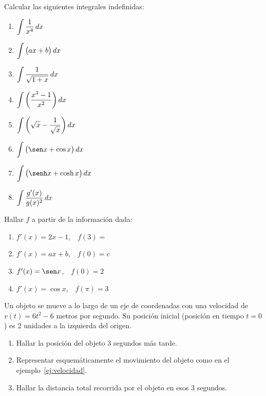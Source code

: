 \item Calcular las siguientes integrales indefinidas:
\begin{multicols}{2}
  \begin{enumerate}
    \item $\displaystyle \int \frac{1}{x^4} \,dx$
    \item $\displaystyle \int \big(ax+b\big) \,dx$
    \item $\displaystyle \int \frac{1}{\sqrt{1+x}} \,dx$
    \item $\displaystyle \int \bigg(\frac{x^3-1}{x^2}\bigg) \,dx$
    \item $\displaystyle \int \bigg(\sqrt{x}-\frac{1}{\sqrt{x}}\bigg) \,dx$
    \item $\D \int \big(\sen x+\cos x\big) \dx$
    \item $\D \int \big(\senh x+\cosh x\big) \dx$
    \item $\displaystyle \int \frac{g'(x)}{g(x)^2} \,dx$
  \end{enumerate}
\end{multicols}

\item Hallar $f$ a partir de la información dada:
\begin{multicols}{2}
  \begin{enumerate}
    \item $f'(x)=2x-1$,\ \ $f(3)= $
    \item $f'(x)=ax+b$,\ \ $f(0)=c $
    \item $f'(x)=\sen x$,\ \ $f(0)= 2$
    \item $f'(x)=\cos x$,\ \ $f(\pi )=3 $
  \end{enumerate}
\end{multicols}

\item Un objeto se mueve a lo largo de un eje de coordenadas con una velocidad de $v(t)=6t^2-6$ metros por segundo. Su posición inicial (posición en tiempo $t=0$) es 2 unidades a la izquierda del origen.
\begin{enumerate}
  \item Hallar la posición del objeto $3$ segundos más tarde.
  \item Representar esquemáticamente el movimiento del objeto como en el ejemplo~\ref{ej:velocidad}.
  \item Hallar la distancia total recorrida por el objeto en esos 3 segundos.
\end{enumerate}